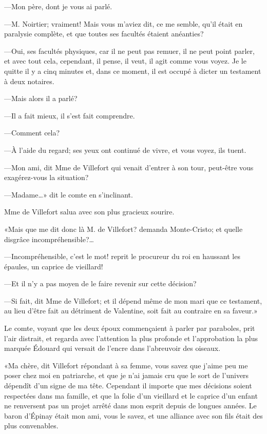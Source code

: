 —Mon père, dont je vous ai parlé. 

—M. Noirtier; vraiment! Mais vous m'aviez dit, ce me semble, qu'il était en paralysie complète, et que toutes ses facultés étaient anéanties? 

—Oui, ses facultés physiques, car il ne peut pas remuer, il ne peut point parler, et avec tout cela, cependant, il pense, il veut, il agit comme vous voyez. Je le quitte il y a cinq minutes et, dans ce moment, il est occupé à dicter un testament à deux notaires. 

—Mais alors il a parlé? 

—Il a fait mieux, il s'est fait comprendre. 

—Comment cela? 

—À l'aide du regard; ses yeux ont continué de vivre, et vous voyez, ils tuent. 

—Mon ami, dit Mme de Villefort qui venait d'entrer à son tour, peut-être vous exagérez-vous la situation? 

—Madame\dots» dit le comte en s'inclinant. 

Mme de Villefort salua avec son plus gracieux sourire. 

«Mais que me dit donc là M. de Villefort? demanda Monte-Cristo; et quelle disgrâce incompréhensible?\dots 

—Incompréhensible, c'est le mot! reprit le procureur du roi en haussant les épaules, un caprice de vieillard! 

—Et il n'y a pas moyen de le faire revenir sur cette décision? 

—Si fait, dit Mme de Villefort; et il dépend même de mon mari que ce testament, au lieu d'être fait au détriment de Valentine, soit fait au contraire en sa faveur.» 

Le comte, voyant que les deux époux commençaient à parler par paraboles, prit l'air distrait, et regarda avec l'attention la plus profonde et l'approbation la plus marquée Édouard qui versait de l'encre dans l'abreuvoir des oiseaux. 

«Ma chère, dit Villefort répondant à sa femme, vous savez que j'aime peu me poser chez moi en patriarche, et que je n'ai jamais cru que le sort de l'univers dépendît d'un signe de ma tête. Cependant il importe que mes décisions soient respectées dans ma famille, et que la folie d'un vieillard et le caprice d'un enfant ne renversent pas un projet arrêté dans mon esprit depuis de longues années. Le baron d'Épinay était mon ami, vous le savez, et une alliance avec son fils était des plus convenables. 


